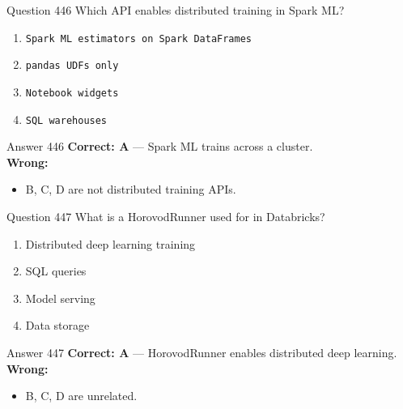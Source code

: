 \documentclass[aspectratio=169,11pt]{beamer}
\begin{document}
	\begin{frame}{Question 446}
		Which API enables distributed training in Spark ML?
		\begin{enumerate}[label=\Alph*.]
			\item \texttt{Spark ML estimators on Spark DataFrames}
			\item \texttt{pandas UDFs only}
			\item \texttt{Notebook widgets}
			\item \texttt{SQL warehouses}
		\end{enumerate}
	\end{frame}
	\begin{frame}{Answer 446}
		\textbf{Correct: A} --- Spark ML trains across a cluster.\\
		\vspace{0.5em}
		\textbf{Wrong:}
		\begin{itemize}
			\item B, C, D are not distributed training APIs.
		\end{itemize}
	\end{frame}
	
	\begin{frame}{Question 447}
		What is a HorovodRunner used for in Databricks?
		\begin{enumerate}[label=\Alph*.]
			\item Distributed deep learning training
			\item SQL queries
			\item Model serving
			\item Data storage
		\end{enumerate}
	\end{frame}
	\begin{frame}{Answer 447}
		\textbf{Correct: A} --- HorovodRunner enables distributed deep learning.\\
		\vspace{0.5em}
		\textbf{Wrong:}
		\begin{itemize}
			\item B, C, D are unrelated.
		\end{itemize}
	\end{frame}
	
\end{document}

